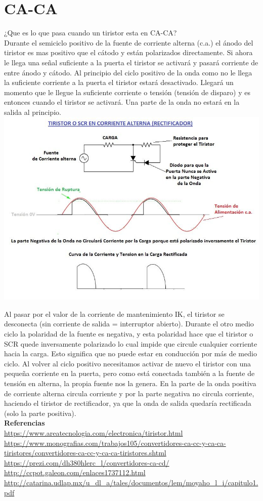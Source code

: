 \documentclass[12pt,a4paper]{article}
\begin{document}
\section{CA-CA}
¿Que es lo que pasa cuando un tiristor esta en CA-CA?\\
Durante el semiciclo positivo de la fuente de corriente alterna (c.a.) el ánodo del tiristor es mas positivo que el cátodo y están polarizados directamente. Si ahora le llega una señal suficiente a la puerta el tiristor se activará y pasará corriente de entre ánodo y cátodo. Al principio del ciclo positivo de la onda como no le llega la suficiente corriente a la puerta el tiristor estará desactivado. Llegará un momento que le llegue la suficiente corriente o tensión (tensión de disparo) y es entonces cuando el tiristor se activará. Una parte de la onda no estará en la salida al principio.
\centering
\includegraphics[scale=.60]{alterna.jpg} 
\raggedright
Al pasar por el valor de la corriente de mantenimiento IK, el tiristor se desconecta (sin corriente de salida = interruptor abierto). Durante el otro medio ciclo la polaridad de la fuente es negativa, y esta polaridad hace que el tiristor o SCR quede inversamente polarizado lo cual impide que circule cualquier corriente hacia la carga. Esto significa que no puede estar en conducción por más de medio ciclo. Al volver al ciclo positivo necesitamos activar de nuevo el tiristor con una pequeña corriente en la puerta, pero como está conectada también a la fuente de tensión en alterna, la propia fuente nos la genera.
En la parte de la onda positiva de corriente alterna circula corriente y por la parte negativa no circula corriente, haciendo el tiristor de rectificador, ya que la onda de salida quedaría rectificada (solo la parte positiva).\\
\newpage
\textbf{Referencias}\\
\url{https://www.areatecnologia.com/electronica/tiristor.html}\\
\url{https://www.monografias.com/trabajos105/convertidores-ca-cc-y-ca-ca-tiristores/convertidores-ca-cc-y-ca-ca-tiristores.shtml}\\
\url{https://prezi.com/dh380hlerc_l/convertidores-ca-cd/}\\
\url{http://ccpot.galeon.com/enlaces1737112.html}\\
\url{http://catarina.udlap.mx/u_dl_a/tales/documentos/lem/moyaho_l_i/capitulo1.pdf}
\end{document}
